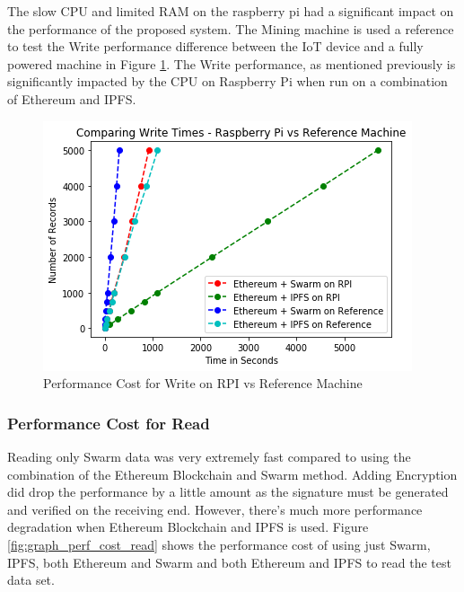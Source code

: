 \documentclass[11pt,openright]{report}
\begin{document}
The slow CPU and limited RAM on the raspberry pi had a significant impact on the performance of the proposed system. The Mining machine is used a reference to test the Write performance difference between the IoT device and a fully powered machine in Figure \ref{fig:graph_perf_cost_write_pi_ref}. The Write performance, as mentioned previously is significantly impacted by the CPU on Raspberry Pi when run on a combination of Ethereum and IPFS.
\begin{figure}
    \centering
    \includegraphics[scale=1]{results/graphs/WriteComp_Pi_v_Ref.png}
    \caption{Performance Cost for Write on RPI vs Reference Machine}
    \label{fig:graph_perf_cost_write_pi_ref}
\end{figure}


\subsubsection{Performance Cost for Read}
Reading only Swarm data was very extremely fast compared to using the combination of the Ethereum Blockchain and Swarm method. Adding Encryption did drop the performance by a little amount as the signature must be generated and verified on the receiving end. However, there's much more performance degradation when Ethereum Blockchain and IPFS is used. Figure \ref{fig:graph_perf_cost_read} shows the performance cost of using just Swarm, IPFS, both Ethereum and Swarm and both Ethereum and IPFS to read the test data set.
\end{document}
